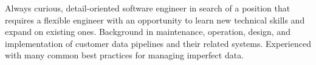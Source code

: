 
Always curious, detail-oriented software engineer in search of a position that requires a flexible engineer with an opportunity to learn new technical skills and expand on existing ones. Background in maintenance, operation, design, and implementation of customer data pipelines and their related systems. Experienced with many common best practices for managing imperfect data.
